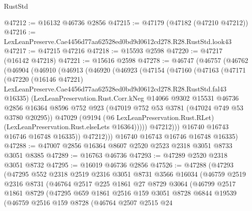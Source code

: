 \begin{lexlean}{RustStd}
\begin{coremodule}
@47212 := @16132 @46736 @2856
@47215 := @47179 (@47182 (@47210 @47212))
@47216 := LexLeanPreserve.Cae4456d77aa62528ed0bd9d0612cd278.R28.RustStd.look43
@47217 := @47215 @47216
@47218 := @15593 @2598
@47220 := @47217 (@16142 @47218)
@47221 := @15616 @2598
@47278 := @46747
    (@46757
      (@46762
        (@46904
          (@46910
            (@46913
              (@46920
                (@46923
                  (@47154
                    (@47160
                      (@47163
                        (@47171
                          (@47220
                            (@16146 @47221)
                            LexLeanPreserve.Cae4456d77aa62528ed0bd9d0612cd278.R28.RustStd.fal43
                            @16335)
                          (LexLeanPreservation.Rust.Corr.kNeg
                            @14066
                            @9302
                            @15531
                            @46736
                            @2856
                            @16364
                            @8596
                            @752
                            @923
                            (@47019 @752 @53 @3781 (@47024 @749 @53 @3780 @20295))
                            @47029
                            (@9194
                              (@6 LexLeanPreservation.Rust.RLet)
                              (LexLeanPreservation.Rust.elseLets @16364)))))
                      @47212)))
                @16740
                @16743
                @16746
                @16748
                @16335))
            @47212)))
      @16740
      @16743
      @16746
      @16748
      @16335)
@47288 := @47007 @2856 @16364 @8607 @2520 @2523 @2318 @3051 @8733 @3051 @8385
@47289 := @16763 @46736
@47293 := @47289 @2520 @2318 @3051 @8732
@47295 := @16019 @46736 @2856
@47526 := @47288
    (@47293
      (@47295
        @552
        @2318
        @2519
        @2316
        @3051
        @8731
        @3566
        @16034
        (@46759
          @2519
          @2316
          @8731
          (@46764
            @2517
            @225
            @1861
            @27
            @8729
            @3064
            (@46799
              @2517
              @1861
              @8729
              (@47295
                @659
                @1861
                @2516
                @159
                @3051
                @8728
                @6844
                @19539
                (@46759
                  @2516
                  @159
                  @8728
                  (@46764
                    @2507
                    @2515
                    @24

\end{coremodule}
\end{lexlean}
